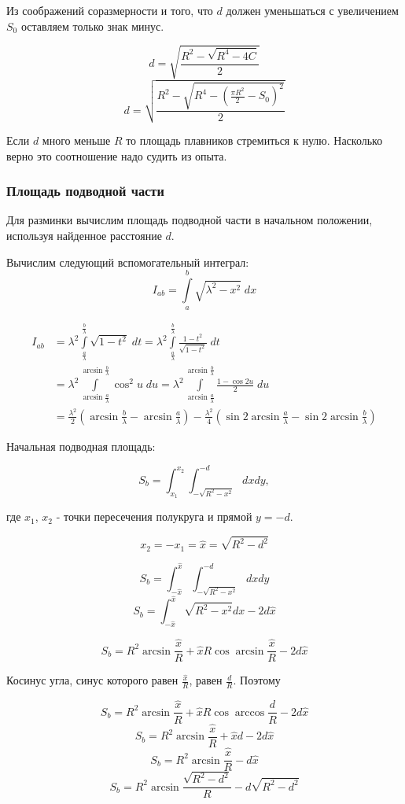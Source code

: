 \documentclass[12pt,a4paper]{article}
\begin{document}
Из соображений соразмерности и того, что $d$ должен уменьшаться с увеличением $S_0$ оставляем только знак минус.

$$ d = \sqrt{\frac{R^2 - \sqrt{R^4-4C}}{2}} $$
$$ d = \sqrt{\frac{R^2 - \sqrt{R^4-(\frac{\pi R^2}{2} - S_0)^2}}{2}} $$

Если $d$ много меньше $R$ то площадь плавников стремиться к нулю. Насколько верно это соотношение надо судить из опыта.

\subsubsection{Площадь подводной части}

Для разминки вычислим площадь подводной части в начальном положении, используя найденное расстояние $d$. 

Вычислим следующий вспомогательный интеграл:
$$ I_{ab} = \int\limits_a^b \sqrt{\lambda^2 - x^2}\;dx $$

\begin{align*}
	I_{ab} &= \lambda^2 \int\limits_\frac{a}{\lambda}^\frac{b}{\lambda} \sqrt{1 - t^2}\;dt 
	= \lambda^2 \int\limits_\frac{a}{\lambda}^\frac{b}{\lambda} \frac{1 - t^2}{\sqrt{1 - t^2}}\;dt \\
	&= \lambda^2 \int\limits_{\arcsin\frac{a}{\lambda}}^{\arcsin\frac{b}{\lambda}} \cos^2u\;du 
	= \lambda^2 \int\limits_{\arcsin\frac{a}{\lambda}}^{\arcsin\frac{b}{\lambda}} \frac{1-\cos2u}{2}\;du \\
	&= \frac{\lambda^2}{2}(\arcsin\frac{b}{\lambda} - \arcsin\frac{a}{\lambda}) - \frac{\lambda^2}{4}(\sin 2\arcsin\frac{a}{\lambda} - \sin 2\arcsin\frac{b}{\lambda}) 
\end{align*}

Начальная подводная площадь:

$$ S_b = \int_{x_1}^{x_2} \int_{-\sqrt{R^2-x^2}}^{-d} dx dy, $$

где $x_1$, $x_2$ - точки пересечения полукруга и прямой $y=-d$. 

$$ x_2 = -x_1 = \hat{x} =\sqrt{R^2 - d^2} $$

$$ S_b = \int_{-\hat{x}}^{\hat{x}} \int_{-\sqrt{R^2-x^2}}^{-d} dx dy $$
$$ S_b = \int_{-\hat{x}}^{\hat{x}} \sqrt{R^2-x^2} dx - 2d\hat{x} $$

$$ S_b = R^2 \arcsin\frac{\hat{x}}{R} + \hat{x}R\cos\arcsin\frac{\hat{x}}{R} - 2d\hat{x} $$

Косинус угла, синус которого равен $\frac{\hat{x}}{R}$, равен $\frac{d}{R}$. Поэтому

$$ S_b = R^2 \arcsin\frac{\hat{x}}{R} + \hat{x}R\cos\arccos\frac{d}{R} - 2d\hat{x} $$
$$ S_b = R^2 \arcsin\frac{\hat{x}}{R} + \hat{x}d - 2d\hat{x} $$
$$ S_b = R^2 \arcsin\frac{\hat{x}}{R} - d\hat{x} $$
$$ S_b = R^2 \arcsin\frac{\sqrt{R^2-d^2}}{R} - d\sqrt{R^2-d^2} $$
\end{document}
